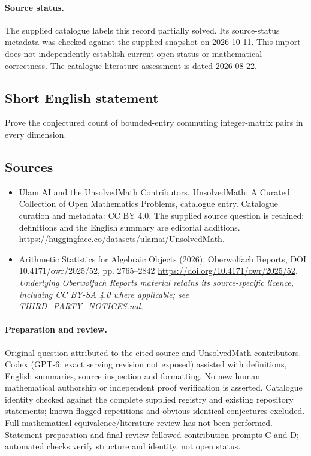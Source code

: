\documentclass[11pt]{article}
\begin{document}
\paragraph{Source status.}
The supplied catalogue labels this record partially solved. Its source-status metadata was checked against the supplied snapshot on 2026-10-11. This import does not independently establish current open status or mathematical correctness. The catalogue literature assessment is dated 2026-08-22.
\subsection{Short English statement}
Prove the conjectured count of bounded-entry commuting integer-matrix pairs in every dimension.
\subsection{Sources}
\begin{itemize}
\item[S1] Ulam AI and the UnsolvedMath Contributors, UnsolvedMath: A Curated Collection of Open Mathematics Problems, catalogue entry. Catalogue curation and metadata: CC BY 4.0. The supplied source question is retained; definitions and the English summary are editorial additions.
\url{https://huggingface.co/datasets/ulamai/UnsolvedMath}.
\item[S2] Arithmetic Statistics for Algebraic Objects (2026), Oberwolfach Reports, DOI 10.4171/owr/2025/52, pp. 2765--2842
\url{https://doi.org/10.4171/owr/2025/52}.
\textit{Underlying Oberwolfach Reports material retains its source-specific licence, including CC BY-SA 4.0 where applicable; see THIRD\_PARTY\_NOTICES.md.}
\end{itemize}
\paragraph{Preparation and review.}
Original question attributed to the cited source and UnsolvedMath contributors. Codex (GPT-6; exact serving revision not exposed) assisted with definitions, English summaries, source inspection and formatting. No new human mathematical authorship or independent proof verification is asserted. Catalogue identity checked against the complete supplied registry and existing repository statements; known flagged repetitions and obvious identical conjectures excluded. Full mathematical-equivalence/literature review has not been performed. Statement preparation and final review followed contribution prompts C and D; automated checks verify structure and identity, not open status.
\label{end:statement}
\end{document}
